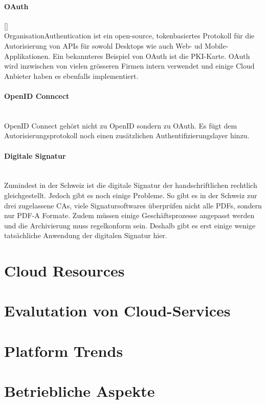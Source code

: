 \documentclass[a4paper, 11pt]{article}
\begin{document}
\paragraph{OAuth}\mbox[]\\
OrganisationAuthentication ist ein open-source, tokenbasiertes Protokoll für die Autorisierung von APIs für sowohl Desktops wie auch Web- ud Mobile-Applikationen. Ein bekannteres Beispiel von OAuth ist die PKI-Karte. OAuth wird inzwischen von vielen grösseren Firmen intern verwendet und einige Cloud Anbieter haben es ebenfalls implementiert.

\paragraph{OpenID Conncect}\mbox{}\\
OpenID Connect gehört nicht zu OpenID sondern zu OAuth. Es fügt dem Autorisierungsprotokoll noch einen zusätzlichen Authentifizierungslayer hinzu. 

\paragraph{Digitale Signatur}\mbox{}\\
Zumindest in der Schweiz ist die digitale Signatur der handschriftlichen rechtlich gleichgestellt. Jedoch gibt es noch einige Probleme. So gibt es in der Schweiz zur drei zugelassene CAs, viele Signatursoftwares überprüfen nicht alle PDFs, sondern nur PDF-A Formate. Zudem müssen einige Geschäftsprozesse angepasst werden und die Archivierung muss regelkonform sein. Deshalb gibt es erst einige wenige tatsächliche Anwendung der digitalen Signatur hier.


\section{Cloud Resources}

\section{Evalutation von Cloud-Services}

\section{Platform Trends}

\section{Betriebliche Aspekte}
\end{document}
